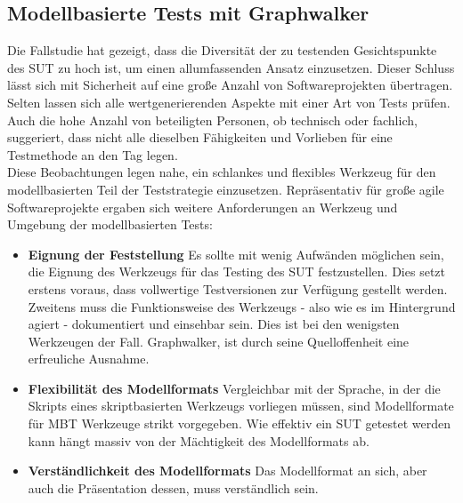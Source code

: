 \subsection{Modellbasierte Tests mit Graphwalker}
\label{sec:mbt_results}
Die Fallstudie hat gezeigt, dass die Diversität der zu testenden Gesichtspunkte des \Gls{SUT} zu hoch ist, um einen allumfassenden Ansatz einzusetzen. Dieser Schluss lässt sich mit Sicherheit auf eine große Anzahl von Softwareprojekten übertragen. Selten lassen sich alle wertgenerierenden Aspekte mit einer Art von Tests prüfen. Auch die hohe Anzahl von beteiligten Personen, ob technisch oder fachlich, suggeriert, dass nicht alle dieselben Fähigkeiten und Vorlieben für eine Testmethode an den Tag legen.\\
Diese Beobachtungen legen nahe, ein schlankes und flexibles Werkzeug für den modellbasierten Teil der Teststrategie einzusetzen. Repräsentativ für große agile Softwareprojekte ergaben sich weitere Anforderungen an Werkzeug und Umgebung der modellbasierten Tests:

\begin{itemize} 
\item\textbf{Eignung der Feststellung} Es sollte mit wenig Aufwänden möglichen sein, die Eignung des Werkzeugs für das Testing des \Gls{SUT} festzustellen. Dies setzt erstens voraus, dass vollwertige Testversionen zur Verfügung gestellt werden. Zweitens muss die Funktionsweise des Werkzeugs - also wie es im Hintergrund agiert - dokumentiert und einsehbar sein. Dies ist bei den wenigsten Werkzeugen der Fall. Graphwalker, ist durch seine Quelloffenheit eine erfreuliche Ausnahme.
\item \textbf{Flexibilität des Modellformats} Vergleichbar mit der Sprache, in der die Skripts eines skriptbasierten Werkzeugs vorliegen müssen, sind Modellformate für \Gls{MBT} Werkzeuge strikt vorgegeben. Wie effektiv ein \Gls{SUT} getestet werden kann hängt massiv von der Mächtigkeit des Modellformats ab.
\item \textbf{Verständlichkeit des Modellformats} Das Modellformat an sich, aber auch die Präsentation dessen, muss verständlich sein.
\end{itemize}

